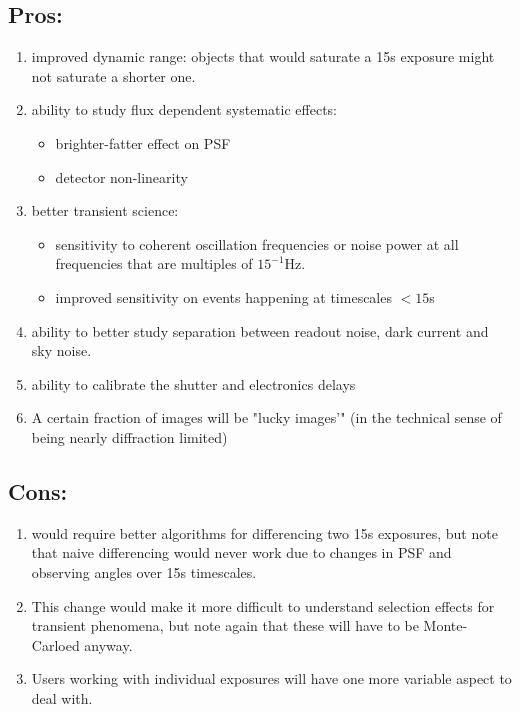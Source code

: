 \documentclass[12pt, a4paper]{article}
\begin{document}
\subsection*{Pros:}

\begin{enumerate}
\item improved dynamic range: objects that would saturate a 15s
  exposure might not saturate a shorter one.

\item ability to study flux dependent systematic effects:
  \begin{itemize}
  \item brighter-fatter effect on PSF
  \item detector non-linearity
  \end{itemize}

\item better transient science:
  \begin{itemize}
  \item sensitivity to coherent oscillation frequencies or noise power at all
    frequencies that are multiples  of $15^{-1}$Hz.
  \item improved sensitivity on events happening at timescales $<15$s 
  \end{itemize}

\item ability to better study separation between readout noise, dark
  current and sky noise. 

\item ability to calibrate the shutter and electronics delays

\item A certain fraction of images will be "lucky images'" (in the
  technical sense of being nearly diffraction limited)

\end{enumerate}

\subsection*{Cons:}

\begin{enumerate}
\item would require better algorithms for differencing two 15s
  exposures, but note that naive differencing would never work due to
  changes in PSF and observing angles over 15s timescales.

\item This change would make it more difficult to understand selection
  effects for transient phenomena, but note again that these will have
  to be Monte-Carloed anyway.

\item Users working with individual exposures will have one more
  variable aspect to deal with.

\end{enumerate}
\end{document}
